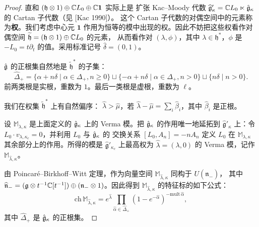 \begin{proof}
    直和 $(\mathfrak h\otimes1)\oplus\mathbb{C} L_0\oplus\mathbb{C}\mathbf 1$ 实际上是
    扩张 Kac--Moody 代数 $\widehat{\mathfrak g}'_\kappa
    =\mathbb{C} L_0\ltimes\hat{\mathfrak{g}}_\kappa$ 的 Cartan 子代数（见 [Kac 1990]）。
    这个 Cartan 子代数的对偶空间中的元素称为\textbf{权}。我们考虑中心元
    $\mathbf 1$ 作用为恒等的模中出现的权。因此不妨把这些权看作对偶空间
    $\widetilde{\mathfrak h}=(\mathfrak h\otimes1)\oplus\mathbb{C} L_0$ 的元素，
    从而看作对 $(\lambda,\phi)$，其中 $\lambda\in\mathfrak h^*$，$\phi$ 是
    $-L_0=t\partial_t$ 的值。采用标准记号 $\widehat\delta=(0,1)$。

    $\hat{\mathfrak{g}}$ 的正根集自然地是 $\widetilde{\mathfrak h}^*$ 的子集：
    \[
        \widehat\Delta_+
        =\{\alpha+n\delta\mid\alpha\in\Delta_+,n\ge0\}
        \sqcup\{-\alpha+n\delta\mid\alpha\in\Delta_+,n>0\}
        \sqcup\{n\delta\mid n>0\}.
    \]
    前两类根是实根，重数为 $1$。最后一类根是虚根，重数为 $\ell$。

    我们在权集 $\widetilde{\mathfrak h}^*$ 上有自然偏序：
    $\widehat\lambda>\widehat\mu$，若
    $\widehat\lambda-\widehat\mu=\sum_i\widehat\beta_i$，其中
    $\widehat\beta_i$ 是正根。

    设 $\mathbb M_{\lambda,\kappa}$ 是上面定义的 $\hat{\mathfrak{g}}_\kappa$ 上的
    Verma 模。把 $\hat{\mathfrak{g}}_\kappa$ 的作用唯一地延拓到
    $\widehat{\mathfrak g}'_\kappa$ 上：令
    $L_0\cdot v_{\lambda,\kappa_c}=0$，并利用 $L_0$ 与 $\hat{\mathfrak{g}}_\kappa$ 的
    交换关系 $[L_0,A_n]=-nA_n$ 定义 $L_0$ 在
    $\mathbb M_{\lambda,\kappa}$ 其余部分上的作用。所得的模是
    $\widehat{\mathfrak g}'_{\kappa_c}$ 上最高权为
    $\widehat\lambda=(\lambda,0)$ 的 Verma 模，记作
    $\mathbb M_{\widehat\lambda,\kappa}$。

    由 Poincar\'e--Birkhoff--Witt 定理，作为向量空间
    $\mathbb M_{\widehat\lambda,\kappa}$ 同构于 $U(\widehat{\mathfrak n}_-)$，
    其中 $\widehat{\mathfrak n}_-=(\mathfrak{g}\otimes t^{-1}\mathbb{C}[t^{-1}])\oplus
    (\mathfrak n_-\otimes1)$。因此得到 $\mathbb M_{\widehat\lambda,\kappa}$
    的特征标的如下公式：
    \begin{equation}
        \mathrm{ch}\,\mathbb M_{\widehat\lambda,\kappa}
        =e^{\widehat\lambda}\prod_{\widehat\alpha\in\widehat\Delta_+}
        (1-e^{-\widehat\alpha})^{-\mathrm{mult}\,\widehat\alpha},
        \tag{6.3-11}
    \end{equation}
    其中 $\widehat\Delta_+$ 是 $\hat{\mathfrak{g}}_\kappa$ 的正根集。


\end{proof}
